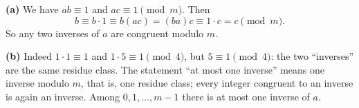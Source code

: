\textbf{(a)} We have $ab\equiv1$ and $ac\equiv1\pmod m$. Then
\[b\equiv b\cdot1\equiv b(ac)=(ba)c\equiv1\cdot c=c\pmod m.\]
So any two inverses of $a$ are congruent modulo $m$.

\textbf{(b)} Indeed $1\cdot1\equiv1$ and $1\cdot5\equiv1\pmod4$, but $5\equiv1\pmod4$: the two ``inverses'' are the same residue class. The statement ``at most one inverse'' means one inverse modulo $m$, that is, one residue class; every integer congruent to an inverse is again an inverse. Among $0,1,\dots,m-1$ there is at most one inverse of $a$.

